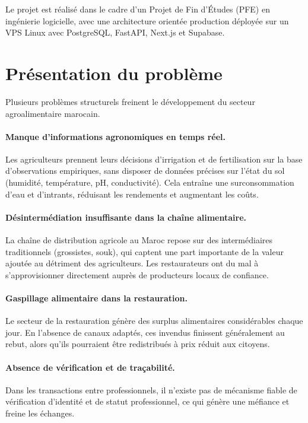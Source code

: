 \documentclass[12pt,a4paper]{report}
\begin{document}
Le projet est réalisé dans le cadre d'un Projet de Fin d'Études (PFE) en ingénierie
logicielle, avec une architecture orientée production déployée sur un VPS Linux avec
PostgreSQL, FastAPI, Next.js et Supabase.

\section{Présentation du problème}

Plusieurs problèmes structurels freinent le développement du secteur agroalimentaire
marocain.

\paragraph{Manque d'informations agronomiques en temps réel.}
Les agriculteurs prennent leurs décisions d'irrigation et de fertilisation sur la base
d'observations empiriques, sans disposer de données précises sur l'état du sol (humidité,
température, pH, conductivité). Cela entraîne une surconsommation d'eau et d'intrants,
réduisant les rendements et augmentant les coûts.

\paragraph{Désintermédiation insuffisante dans la chaîne alimentaire.}
La chaîne de distribution agricole au Maroc repose sur des intermédiaires traditionnels
(grossistes, souk), qui captent une part importante de la valeur ajoutée au détriment
des agriculteurs. Les restaurateurs ont du mal à s'approvisionner directement auprès de
producteurs locaux de confiance.

\paragraph{Gaspillage alimentaire dans la restauration.}
Le secteur de la restauration génère des surplus alimentaires considérables chaque jour.
En l'absence de canaux adaptés, ces invendus finissent généralement au rebut, alors qu'ils
pourraient être redistribués à prix réduit aux citoyens.

\paragraph{Absence de vérification et de traçabilité.}
Dans les transactions entre professionnels, il n'existe pas de mécanisme fiable de
vérification d'identité et de statut professionnel, ce qui génère une méfiance et freine
les échanges.
\end{document}
